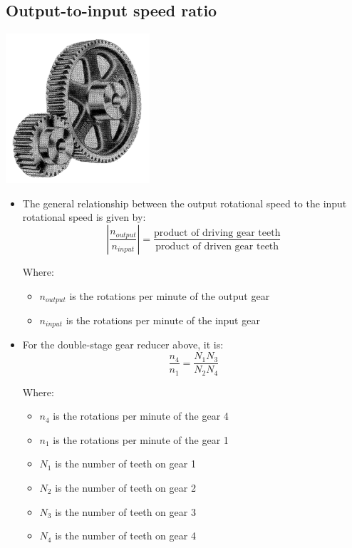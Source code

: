 \documentclass[11pt]{article}
\begin{document}
\subsection{Output-to-input speed ratio}
\label{sec:org75040ee}
\begin{center}
\includegraphics[height=15em]{./images/double-stage-gear-reducer-image.png}
\end{center}
\begin{itemize}
\item The general relationship between the output rotational speed to the input rotational speed is given by:
\[\left|\frac{n_{output}}{n_{input}} \right| = \frac{\text{product of driving gear teeth}}{\text{product of driven gear teeth}}\]

Where:
\begin{itemize}
\item \(n_{output}\) is the rotations per minute of the output gear
\item \(n_{input}\) is the rotations per minute of the input gear
\end{itemize}

\item For the double-stage gear reducer above, it is:
\[\frac{n_4}{n_1} = \frac{N_1 N_3}{N_2 N_4}\]

Where:
\begin{itemize}
\item \(n_4\) is the rotations per minute of the gear 4
\item \(n_1\) is the rotations per minute of the gear 1
\item \(N_1\) is the number of teeth on gear 1
\item \(N_2\) is the number of teeth on gear 2
\item \(N_3\) is the number of teeth on gear 3
\item \(N_4\) is the number of teeth on gear 4
\end{itemize}
\end{itemize}
\end{document}
